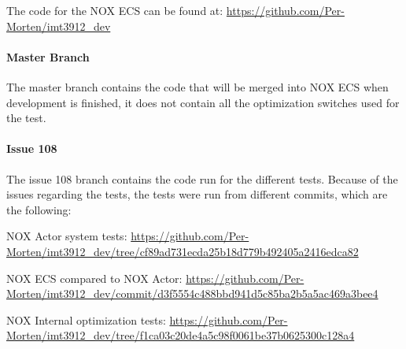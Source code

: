 The code for the NOX ECS can be found at:
\url{https://github.com/Per-Morten/imt3912_dev}

\paragraph{Master Branch}
The master branch contains the code that will be merged into NOX ECS when development is finished,
it does not contain all the optimization switches used for the test.

\paragraph{Issue 108}
The issue 108 branch contains the code run for the different tests.
Because of the issues regarding the tests, the tests were run from different commits, which are the following:

NOX Actor system tests:
\url{https://github.com/Per-Morten/imt3912_dev/tree/cf89ad731ecda25b18d779b492405a2416edca82}

NOX ECS compared to NOX Actor:
\url{https://github.com/Per-Morten/imt3912_dev/commit/d3f5554c488bbd941d5c85ba2b5a5ac469a3bee4}

NOX Internal optimization tests:
\url{https://github.com/Per-Morten/imt3912_dev/tree/f1ca03c20de4a5c98f0061be37b0625300c128a4}
